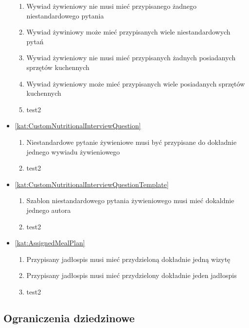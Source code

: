 \begin{itemize}[label={\textbf{Reguły dla}}, wide, labelwidth=!, labelindent=0pt]
\begin{enumerate}[label={\textbf{REG/\protect\threedigits{\arabic{enumi}}}}, wide, labelwidth=!, align=left, leftmargin=3cm, resume]
        \item Wywiad żywieniowy nie musi mieć przypisanego żadnego niestandardowego pytania
        \item Wywiad żywiniowy może mieć przypisanych wiele niestandardowych pytań
        \item Wywiad żywieniowy nie musi mieć przypisanych żadnych posiadanych sprzętów kuchennych
        \item Wywiad żywieniowy może mieć przypisanych wiele posiadanych sprzętów kuchennych
        \item test2
    \end{enumerate}
    \item\ref{kat:CustomNutritionalInterviewQuestion}
    \begin{enumerate}[label={\textbf{REG/\protect\threedigits{\arabic{enumi}}}}, wide, labelwidth=!, align=left, leftmargin=3cm, resume]
        \item Niestandardowe pytanie żywieniowe musi być przypisane do dokładnie jednego wywiadu żywieniowego
        \item test2
    \end{enumerate}
    \item\ref{kat:CustomNutritionalInterviewQuestionTemplate}
    \begin{enumerate}[label={\textbf{REG/\protect\threedigits{\arabic{enumi}}}}, wide, labelwidth=!, align=left, leftmargin=3cm, resume]
        \item Szablon niestandardowego pytania żywieniowego musi mieć dokaldnie jednego autora
        \item test2
    \end{enumerate}
    \item\ref{kat:AssignedMealPlan}
    \begin{enumerate}[label={\textbf{REG/\protect\threedigits{\arabic{enumi}}}}, wide, labelwidth=!, align=left, leftmargin=3cm, resume]
        \item Przypisany jadłospis musi mieć przydzieloną dokładnie jedną wizytę
        \item Przypisany jadłospis musi mieć przydzielony dokładnie jeden jadłospis
        \item test2
    \end{enumerate}
\end{itemize}

\subsection{Ograniczenia dziedzinowe}

